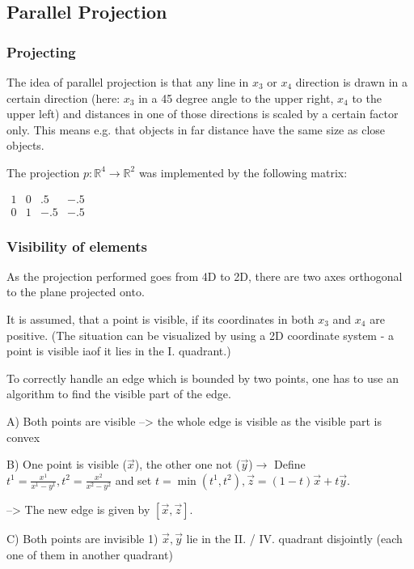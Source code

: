 \documentclass[titlepage]{scrartcl}
\begin{document}
\subsection{Parallel Projection}
\subsubsection{Projecting}
The idea of parallel projection is that any line in $x_3$ or $x_4$ direction is drawn in a certain direction (here: $x_3$ in a 45 degree angle to the upper right, $x_4$ to the upper left) and distances in one of those directions is scaled by a certain factor only. This means e.g. that objects in far distance have the same size as close objects. 

The projection $ p : \mathbb{R}^4 \to \mathbb{R}^2$ was implemented by the following matrix: 
\newline

$\begin{array}{cccc}
1 & 0 & .5 & -.5 \\ 
0 & 1 & -.5 & -.5
\end{array} $

\subsubsection{Visibility of elements}

As the projection performed goes from 4D to 2D, there are two axes orthogonal to the plane projected onto. 

It is assumed, that a point is visible, if its coordinates in both $x_3$ and $x_4$ are positive. (The situation can be visualized by using a 2D coordinate system - a point is visible iaof it lies in the I. quadrant.)

To correctly handle an edge which is bounded by two points, one has to use an algorithm to find the visible part of the edge. 

A) Both points are visible --> the whole edge is visible as the visible part is convex

B) One point is visible ($\vec{x}$), the other one not ($\vec{y}$)$\rightarrow$
Define $t^1 = \frac{x^1}{x^1 - y^1}, t^2 = \frac{x^2}{x^2 - y^2}$ and set $ t = \min(t^1, t^2), \vec{z} = (1 - t) \vec{x} + t \vec{y}$.

--> The new edge is given by $[\vec{x}, \vec{z}]$.

C) Both points are invisible
1) $\vec{x}, \vec{y}$ lie in the II. / IV. quadrant disjointly (each one of them in another quadrant)
\end{document}
